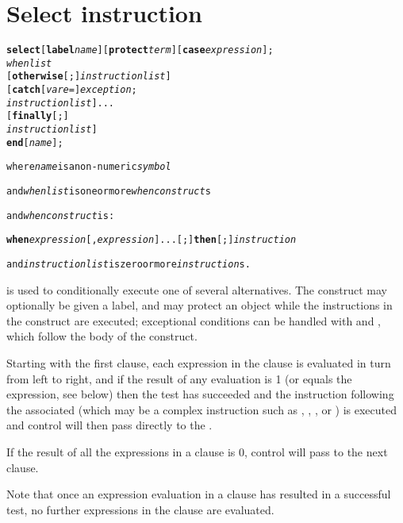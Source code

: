 \section{Select instruction}
\index{,}
\index{,}
\index{,}
\index{,}
\begin{shaded}
\begin{alltt}
\textbf{select} [\textbf{label} \emph{name}] [\textbf{protect} \emph{term}] [\textbf{case} \emph{expression}];
        \emph{whenlist}
        [\textbf{otherwise}[;] \emph{instructionlist}]
    [\textbf{catch} [\emph{vare} =] \emph{exception};
        \emph{instructionlist}]...
    [\textbf{finally}[;]
        \emph{instructionlist}]
    \textbf{end} [\emph{name}];

where \emph{name} is a non-numeric \emph{symbol}

and \emph{whenlist} is one or more \emph{whenconstruct}s

and \emph{whenconstruct} is:

    \textbf{when} \emph{expression}[, \emph{expression}]... [;] \textbf{then}[;] \emph{instruction}

and \emph{instructionlist} is zero or more \emph{instruction}s.
\end{alltt}
\end{shaded}
  is used to conditionally execute one of several
alternatives.
The construct may optionally be given a label, and may protect an object
while the instructions in the construct are executed; exceptional
conditions can be handled with  and ,
which follow the body of the construct.
 
Starting with the first  clause, each expression in
the clause is evaluated in turn from left to right, and if the
result of any evaluation is 1 (or equals the 
expression, see below) then the test has succeeded and the
instruction following the associated  (which may be
a complex instruction such as , ,
, or ) is executed and control will
then pass directly to the .
 
If the result of all the expressions in a  clause
is 0, control will pass to the next  clause.
 
Note that once an expression evaluation in a 
clause has resulted in a successful test, no further expressions
in the clause are evaluated.
 
